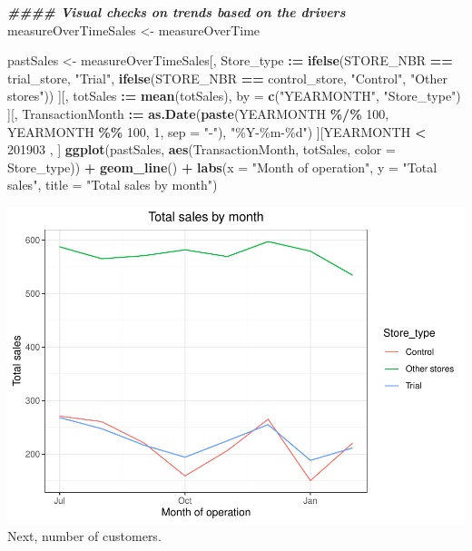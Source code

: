 \documentclass[
]{article}
\newenvironment{Shaded}{\begin{snugshade}}{\end{snugshade}}
\newcommand{\AttributeTok}[1]{\textcolor[rgb]{0.13,0.29,0.53}{#1}}
\newcommand{\DecValTok}[1]{\textcolor[rgb]{0.00,0.00,0.81}{#1}}
\newcommand{\DocumentationTok}[1]{\textcolor[rgb]{0.56,0.35,0.01}{\textbf{\textit{#1}}}}
\newcommand{\FunctionTok}[1]{\textcolor[rgb]{0.13,0.29,0.53}{\textbf{#1}}}
\newcommand{\NormalTok}[1]{#1}
\newcommand{\OtherTok}[1]{\textcolor[rgb]{0.56,0.35,0.01}{#1}}
\newcommand{\SpecialCharTok}[1]{\textcolor[rgb]{0.81,0.36,0.00}{\textbf{#1}}}
\newcommand{\StringTok}[1]{\textcolor[rgb]{0.31,0.60,0.02}{#1}}
\begin{document}
\begin{Shaded}
\begin{Highlighting}[]
\DocumentationTok{\#\#\#\# Visual checks on trends based on the drivers}
\NormalTok{measureOverTimeSales }\OtherTok{\textless{}{-}}\NormalTok{ measureOverTime}

\NormalTok{pastSales }\OtherTok{\textless{}{-}}\NormalTok{ measureOverTimeSales[, Store\_type }\SpecialCharTok{:=} \FunctionTok{ifelse}\NormalTok{(STORE\_NBR }\SpecialCharTok{==}\NormalTok{ trial\_store,}
\StringTok{"Trial"}\NormalTok{,}
                                          \FunctionTok{ifelse}\NormalTok{(STORE\_NBR }\SpecialCharTok{==}\NormalTok{ control\_store,}
\StringTok{"Control"}\NormalTok{, }\StringTok{"Other stores"}\NormalTok{))}
\NormalTok{                              ][, totSales }\SpecialCharTok{:=} \FunctionTok{mean}\NormalTok{(totSales), by }\OtherTok{=} \FunctionTok{c}\NormalTok{(}\StringTok{"YEARMONTH"}\NormalTok{,}
\StringTok{"Store\_type"}\NormalTok{)}
\NormalTok{                              ][, TransactionMonth }\SpecialCharTok{:=} \FunctionTok{as.Date}\NormalTok{(}\FunctionTok{paste}\NormalTok{(YEARMONTH }\SpecialCharTok{\%/\%}
\DecValTok{100}\NormalTok{, YEARMONTH }\SpecialCharTok{\%\%} \DecValTok{100}\NormalTok{, }\DecValTok{1}\NormalTok{, }\AttributeTok{sep =} \StringTok{"{-}"}\NormalTok{), }\StringTok{"\%Y{-}\%m{-}\%d"}\NormalTok{)}
\NormalTok{                              ][YEARMONTH }\SpecialCharTok{\textless{}} \DecValTok{201903}\NormalTok{ , ]}
\FunctionTok{ggplot}\NormalTok{(pastSales, }\FunctionTok{aes}\NormalTok{(TransactionMonth, totSales, }\AttributeTok{color =}\NormalTok{ Store\_type)) }\SpecialCharTok{+}
  \FunctionTok{geom\_line}\NormalTok{() }\SpecialCharTok{+}
  \FunctionTok{labs}\NormalTok{(}\AttributeTok{x =} \StringTok{"Month of operation"}\NormalTok{, }\AttributeTok{y =} \StringTok{"Total sales"}\NormalTok{, }\AttributeTok{title =} \StringTok{"Total sales by month"}\NormalTok{)}
\end{Highlighting}
\end{Shaded}

\includegraphics{InsideSherpa_Task2_files/figure-latex/unnamed-chunk-7-1.pdf}
Next, number of customers.
\end{document}
